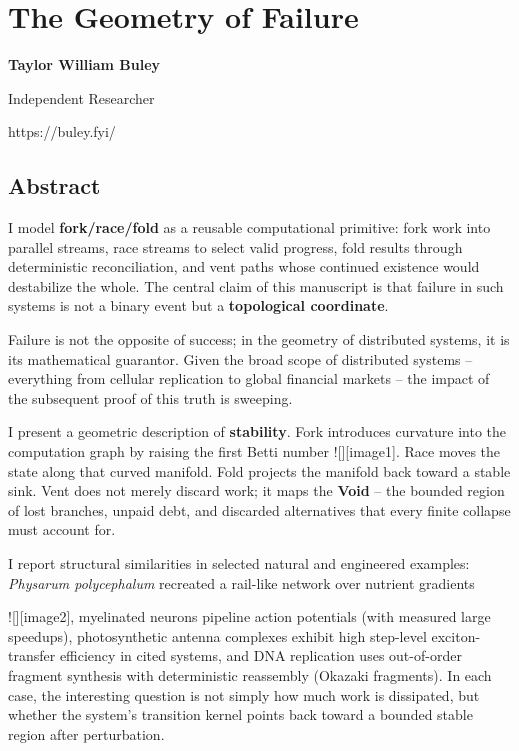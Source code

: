 \documentclass[
]{article}
\author{}
\date{}
\begin{document}
\section{\texorpdfstring{\textbf{The Geometry of
Failure}}{The Geometry of Failure}}\label{the-geometry-of-failure}

\textbf{Taylor William Buley}

Independent Researcher

https://buley.fyi/

\subsection{\texorpdfstring{\textbf{Abstract}}{Abstract}}\label{abstract}

I model \textbf{fork/race/fold} as a reusable computational primitive:
fork work into parallel streams, race streams to select valid progress,
fold results through deterministic reconciliation, and vent paths whose
continued existence would destabilize the whole. The central claim of
this manuscript is that failure in such systems is not a binary event
but a \textbf{topological coordinate}.

Failure is not the opposite of success; in the geometry of distributed
systems, it is its mathematical guarantor. Given the broad scope of
distributed systems -- everything from cellular replication to global
financial markets -- the impact of the subsequent proof of this truth is
sweeping.

I present a geometric description of \textbf{stability}. Fork introduces
curvature into the computation graph by raising the first Betti number
!{[}{]}{[}image1{]}. Race moves the state along that curved manifold.
Fold projects the manifold back toward a stable sink. Vent does not
merely discard work; it maps the \textbf{Void} -- the bounded region of
lost branches, unpaid debt, and discarded alternatives that every finite
collapse must account for.

I report structural similarities in selected natural and engineered
examples: \emph{Physarum polycephalum} recreated a rail-like network
over nutrient gradients

!{[}{]}{[}image2{]}, myelinated neurons pipeline action potentials (with
measured large speedups), photosynthetic antenna complexes exhibit high
step-level exciton-transfer efficiency in cited systems, and DNA
replication uses out-of-order fragment synthesis with deterministic
reassembly (Okazaki fragments). In each case, the interesting question
is not simply how much work is dissipated, but whether the system's
transition kernel points back toward a bounded stable region after
perturbation.
\end{document}
